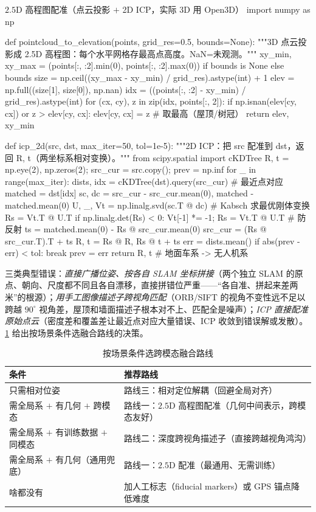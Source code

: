 \begin{codebox}[Python]{$2.5$D 高程图配准（点云投影 $+$ 2D ICP，实际 3D 用 Open3D）}
import numpy as np

def pointcloud_to_elevation(points, grid_res=0.5, bounds=None):
    """3D 点云投影成 2.5D 高程图：每个水平网格存最高点高度。NaN=未观测。"""
    xy_min, xy_max = (points[:, :2].min(0), points[:, :2].max(0)) if bounds is None else bounds
    size = np.ceil((xy_max - xy_min) / grid_res).astype(int) + 1
    elev = np.full((size[1], size[0]), np.nan)
    idx = ((points[:, :2] - xy_min) / grid_res).astype(int)
    for (cx, cy), z in zip(idx, points[:, 2]):
        if np.isnan(elev[cy, cx]) or z > elev[cy, cx]:
            elev[cy, cx] = z                              # 取最高（屋顶/树冠）
    return elev, xy_min

def icp_2d(src, dst, max_iter=50, tol=1e-5):
    """2D ICP：把 src 配准到 dst，返回 R, t（两坐标系相对变换）。"""
    from scipy.spatial import cKDTree
    R, t = np.eye(2), np.zeros(2); src_cur = src.copy(); prev = np.inf
    for _ in range(max_iter):
        dists, idx = cKDTree(dst).query(src_cur)         # 最近点对应
        matched = dst[idx]
        sc, dc = src_cur - src_cur.mean(0), matched - matched.mean(0)
        U, _, Vt = np.linalg.svd(sc.T @ dc)              # Kabsch 求最优刚体变换
        Rs = Vt.T @ U.T
        if np.linalg.det(Rs) < 0: Vt[-1] *= -1; Rs = Vt.T @ U.T   # 防反射
        ts = matched.mean(0) - Rs @ src_cur.mean(0)
        src_cur = (Rs @ src_cur.T).T + ts
        R, t = Rs @ R, Rs @ t + ts
        err = dists.mean()
        if abs(prev - err) < tol: break
        prev = err
    return R, t                                          # 地面车系 -> 无人机系
\end{codebox}

\noindent 三类典型错误：\emph{直接广播位姿、按各自 SLAM 坐标拼接}（两个独立 SLAM 的原点、朝向、尺度都不同且各自漂移，直接拼错位严重——“各自准、拼起来差两米”的根源）；\emph{用手工图像描述子跨视角匹配}（ORB/SIFT 的视角不变性远不足以跨越 $90^\circ$ 视角差，屋顶和墙面描述子根本对不上、匹配全是噪声）；\emph{ICP 直接配准原始点云}（密度差和覆盖差让最近点对应大量错误、ICP 收敛到错误解或发散）。\cref{tab:hmr-fusion-choice} 给出按场景条件选融合路线的决策。

\begin{table}[H]\centering\small
\caption{按场景条件选跨模态融合路线}
\label{tab:hmr-fusion-choice}
\begin{tabular}{ll}
\toprule
条件 & 推荐路线 \\
\midrule
只需相对位姿 & 路线三：相对定位解耦（回避全局对齐） \\
需全局系 $+$ 有几何 $+$ 跨模态 & 路线一：$2.5\mathrm{D}$ 高程图配准（几何中间表示，跨模态友好） \\
需全局系 $+$ 有训练数据 $+$ 同模态 & 路线二：深度跨视角描述子（直接跨越视角鸿沟） \\
需全局系 $+$ 有几何（通用兜底） & 路线一：$2.5\mathrm{D}$ 配准（最通用、无需训练） \\
啥都没有 & 加人工标志（fiducial markers）或 GPS 锚点降低难度 \\
\bottomrule
\end{tabular}
\end{table}

